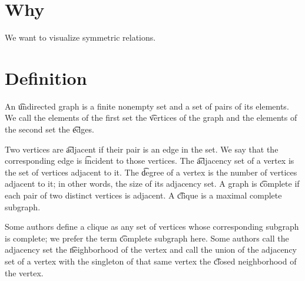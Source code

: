 
\sbasic























\sstart
{}

\section{Why}

We want to visualize symmetric relations.

\section{Definition}

An \t{undirected graph} is a finite nonempty set and a set of pairs of its elements.
We call the elements of the first set the \t{vertices} of the graph and the elements of the second set the \t{edges}.

Two vertices are \t{adjacent} if their pair is an edge in the set.
We say that the corresponding edge is \t{incident} to those vertices.
The \t{adjacency set} of a vertex is the set of vertices adjacent to it.
The \t{degree} of a vertex is the number of vertices adjacent to it; in other words, the size of its adjacency set.
A graph is \t{complete} if each pair of two distinct vertices is adjacent.
A \t{clique} is a maximal complete subgraph.


Some authors define a clique as any set of vertices whose corresponding subgraph is complete; we prefer the term \t{complete subgraph} here.
Some authors call the adjacency set the \t{neighborhood} of the vertex and call the union of the adjacency set of a vertex with the singleton of that same vertex the \t{closed neighborhood} of the vertex.

